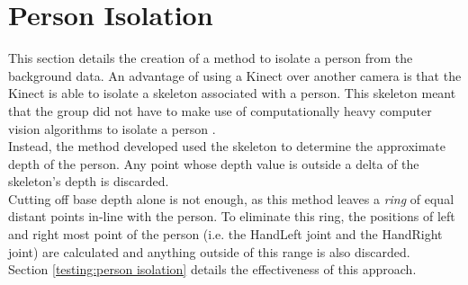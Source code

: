\section{Person Isolation}
\label{design:person isolation}
This section details the creation of a method to isolate a person from the background data.
An advantage of using a Kinect over another camera is that the Kinect is able to isolate a skeleton associated with a person.
This skeleton meant that the group did not have to make use of computationally heavy computer vision algorithms to isolate a person .\\

Instead, the method developed used the skeleton to determine the approximate depth of the person. 
Any point whose depth value is outside a delta of the skeleton's depth is discarded.\\ 

Cutting off base depth alone is not enough, as this method leaves a \textit{ring} of equal distant points in-line with the person. 
To eliminate this ring, the positions of left and right most point of the person (i.e. the HandLeft joint and the HandRight joint) are calculated and anything outside of this range is also discarded. \\

Section \ref{testing:person isolation} details the effectiveness of this approach.